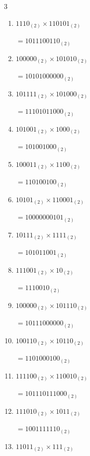 \begin{multicols}{3}
\begin{enumerate}
        $=100111000_{(2)}$

  \item $1110_{(2)} \times 110101_{(2)}$

        $=1011100110_{(2)}$

  \item $100000_{(2)} \times 101010_{(2)}$

        $=10101000000_{(2)}$

  \item $101111_{(2)} \times 101000_{(2)}$

        $=11101011000_{(2)}$

\columnbreak %

  \item $101001_{(2)} \times 1000_{(2)}$

        $=101001000_{(2)}$

  \item $100011_{(2)} \times 1100_{(2)}$

        $=110100100_{(2)}$

  \item $10101_{(2)} \times 110001_{(2)}$

        $=10000000101_{(2)}$

  \item $10111_{(2)} \times 1111_{(2)}$

        $=101011001_{(2)}$

  \item $111001_{(2)} \times 10_{(2)}$

        $=1110010_{(2)}$

\columnbreak %

  \item $100000_{(2)} \times 101110_{(2)}$

        $=10111000000_{(2)}$

  \item $100110_{(2)} \times 10110_{(2)}$

        $=1101000100_{(2)}$

  \item $111100_{(2)} \times 110010_{(2)}$

        $=101110111000_{(2)}$

  \item $111010_{(2)} \times 1011_{(2)}$

        $=1001111110_{(2)}$

  \item $11011_{(2)} \times 111_{(2)}$


\end{enumerate}
\end{multicols}
